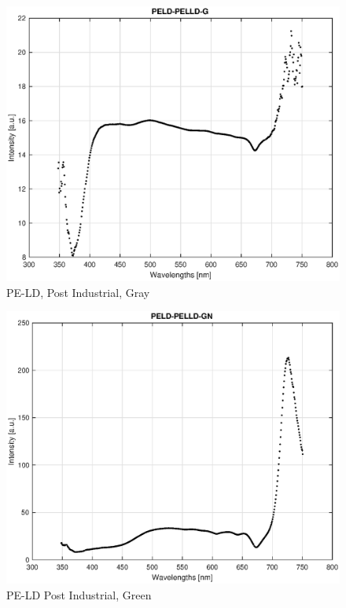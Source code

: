 \begin{appendices}
\begin{figure}
    \centering
    \includegraphics[width = 12cm]{Images/appendix/pe-ld-postindust-gray.eps}
    \caption[$\; \:$PE-LD Post Industrial, Gray]{PE-LD, Post Industrial, Gray}
    \label{fig:peld-gray}
\end{figure}

\begin{figure}
    \centering
    \includegraphics[width = 12cm]{Images/appendix/pe-ld-postindust-green.eps}
    \caption[$\; \:$PE-LD Post Industrial, Green]{PE-LD Post Industrial, Green}
    \label{fig:peld-green}
\end{figure}


\end{appendices}
